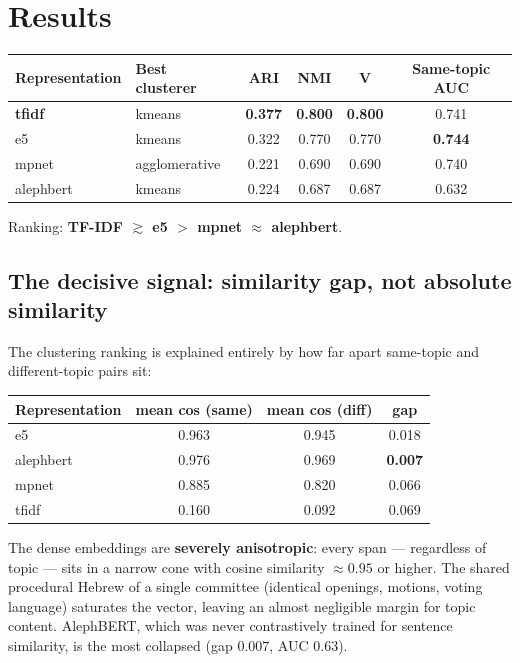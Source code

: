 \documentclass[11pt,a4paper]{article}
\begin{document}
\section{Results}

\begin{center}
\begin{tabular}{llcccc}
\toprule
\textbf{Representation} & \textbf{Best clusterer} & \textbf{ARI} & \textbf{NMI} & \textbf{V} & \textbf{Same-topic AUC} \\
\midrule
\textbf{tfidf}     & kmeans        & \textbf{0.377} & \textbf{0.800} & \textbf{0.800} & 0.741 \\
e5                 & kmeans        & 0.322 & 0.770 & 0.770 & \textbf{0.744} \\
mpnet              & agglomerative & 0.221 & 0.690 & 0.690 & 0.740 \\
alephbert          & kmeans        & 0.224 & 0.687 & 0.687 & 0.632 \\
\bottomrule
\end{tabular}
\end{center}

\noindent Ranking: \textbf{TF-IDF $\gtrsim$ e5 $>$ mpnet $\approx$ alephbert}.

\subsection{The decisive signal: similarity gap, not absolute similarity}

The clustering ranking is explained entirely by how far apart same-topic and different-topic
pairs sit:

\begin{center}
\begin{tabular}{lccc}
\toprule
\textbf{Representation} & \textbf{mean cos (same)} & \textbf{mean cos (diff)} & \textbf{gap} \\
\midrule
e5         & 0.963 & 0.945 & 0.018 \\
alephbert  & 0.976 & 0.969 & \textbf{0.007} \\
mpnet      & 0.885 & 0.820 & 0.066 \\
tfidf      & 0.160 & 0.092 & 0.069 \\
\bottomrule
\end{tabular}
\end{center}

The dense embeddings are \textbf{severely anisotropic}: every span --- regardless of topic ---
sits in a narrow cone with cosine similarity $\approx 0.95$ or higher. The shared procedural
Hebrew of a single committee (identical openings, motions, voting language) saturates the vector,
leaving an almost negligible margin for topic content. AlephBERT, which was never contrastively
trained for sentence similarity, is the most collapsed (gap $0.007$, AUC $0.63$).
\end{document}

